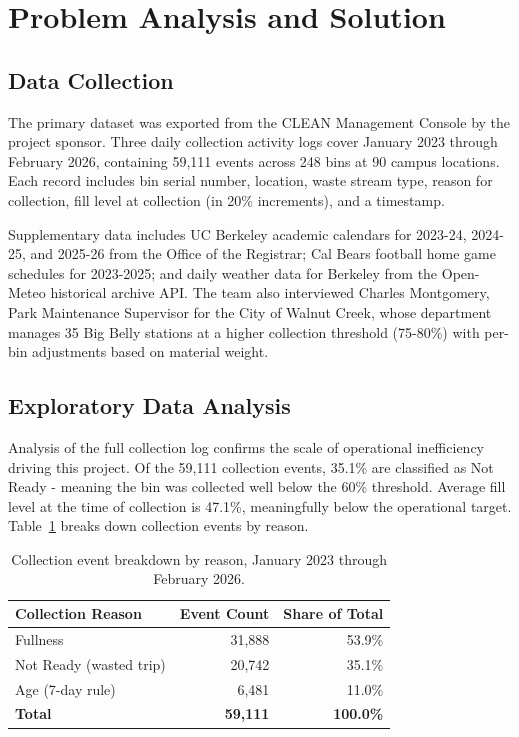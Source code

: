 \documentclass[11pt]{article}
\begin{document}
\newpage

\section{Problem Analysis and Solution}

\subsection{Data Collection}

The primary dataset was exported from the CLEAN Management Console by the project sponsor.
Three daily collection activity logs cover January 2023 through February 2026, containing
59,111 events across 248 bins at 90 campus locations. Each record includes bin serial
number, location, waste stream type, reason for collection, fill level at collection (in
20\% increments), and a timestamp.

Supplementary data includes UC Berkeley academic calendars for 2023-24, 2024-25, and
2025-26 from the Office of the Registrar; Cal Bears football home game schedules for
2023-2025; and daily weather data for Berkeley from the Open-Meteo historical archive API.
The team also interviewed Charles Montgomery, Park Maintenance Supervisor for the City of
Walnut Creek, whose department manages 35 Big Belly stations at a higher collection
threshold (75-80\%) with per-bin adjustments based on material weight.

\subsection{Exploratory Data Analysis}

Analysis of the full collection log confirms the scale of operational inefficiency driving
this project. Of the 59,111 collection events, 35.1\% are classified as Not Ready -
meaning the bin was collected well below the 60\% threshold. Average fill level at the
time of collection is 47.1\%, meaningfully below the operational target.
Table~\ref{tab:reasons} breaks down collection events by reason.

\begin{table}[ht]
\centering
\caption{Collection event breakdown by reason, January 2023 through February 2026.}
\label{tab:reasons}
\begin{tabular}{lrr}
\toprule
\textbf{Collection Reason}   & \textbf{Event Count} & \textbf{Share of Total} \\
\midrule
Fullness                     & 31,888               & 53.9\%                  \\
Not Ready (wasted trip)      & 20,742               & 35.1\%                  \\
Age (7-day rule)             & 6,481                & 11.0\%                  \\
\midrule
\textbf{Total}               & \textbf{59,111}      & \textbf{100.0\%}        \\
\bottomrule
\end{tabular}
\end{table}
\end{document}
